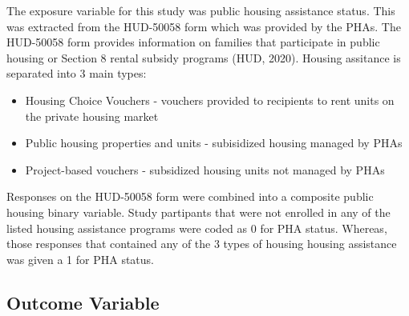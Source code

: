 \documentclass [11pt, proquest] {uwthesis}[2015/03/03]
\providecommand{\tightlist}{%
  \setlength{\itemsep}{0pt}\setlength{\parskip}{0pt}}
\begin{document}
The exposure variable for this study was public housing assistance
status. This was extracted from the HUD-50058 form which was provided by
the PHAs. The HUD-50058 form provides information on families that
participate in public housing or Section 8 rental subsidy programs (HUD,
2020). Housing assitance is separated into 3 main types:
\begin{itemize}
\tightlist
\item
  Housing Choice Vouchers - vouchers provided to recipients to rent
  units on the private housing market
\item
  Public housing properties and units - subisidized housing managed by
  PHAs
\item
  Project-based vouchers - subsidized housing units not managed by PHAs
\end{itemize}
Responses on the HUD-50058 form were combined into a composite public
housing binary variable. Study partipants that were not enrolled in any
of the listed housing assistance programs were coded as 0 for PHA
status. Whereas, those responses that contained any of the 3 types of
housing housing assistance was given a 1 for PHA status.

\subsection{Outcome Variable}\label{outcome-variable}
\end{document}
